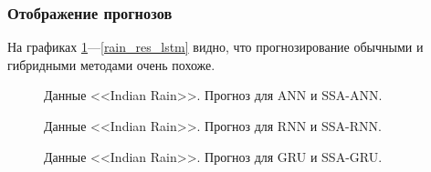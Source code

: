 \documentclass[specialist,
               substylefile = spbu.rtx,
               subf,href,colorlinks=true, 12p]{disser}
\newcommand{\multiref}[2]{\ref{#1}---\ref{#2}}
\begin{document}
\subsubsection{Отображение прогнозов}

На графиках \multiref{rain_res_ann}{rain_res_lstm} видно, что прогнозирование обычными и гибридными методами очень похоже.

\begin{figure}[H]
	\captionsetup{justification=centering}
	\caption{Данные <<Indian Rain>>. Прогноз для ANN и SSA-ANN.}
	\label{rain_res_ann}
\end{figure}

\begin{figure}[H]
	\captionsetup{justification=centering}
	\caption{Данные <<Indian Rain>>. Прогноз для RNN и SSA-RNN.}
	\label{rain_res_rnn}
\end{figure}

\begin{figure}[H]
	\captionsetup{justification=centering}
	\caption{Данные <<Indian Rain>>. Прогноз для GRU и SSA-GRU.}
	\label{rain_res_gru}
\end{figure}
\end{document}
